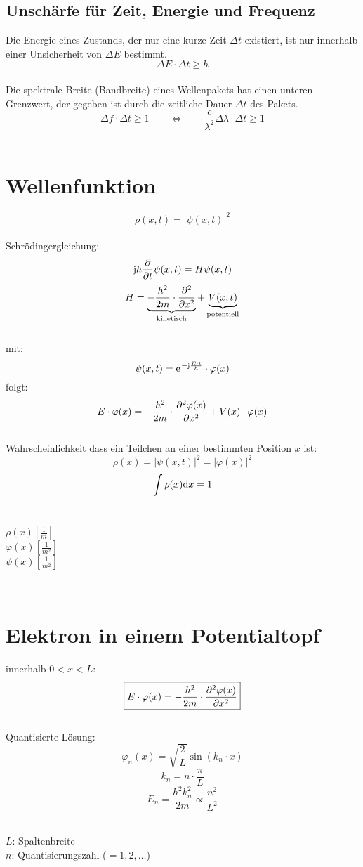 \subsection{Unschärfe für Zeit, Energie und Frequenz}
Die Energie eines Zustands, der nur eine kurze Zeit $\Delta t$ existiert, ist nur innerhalb einer Unsicherheit von $\Delta E$ bestimmt.\\
\[
	\Delta E \cdot \Delta t \geq h
\]
\\
Die spektrale Breite (Bandbreite) eines Wellenpakets hat einen unteren Grenzwert, der gegeben ist durch die zeitliche Dauer $\Delta t$ des Pakets.
\[
	\Delta f \cdot \Delta t \geq 1 
	\qquad \Leftrightarrow \qquad
	\frac{c}{\lambda^2}\Delta \lambda \cdot \Delta t \geq 1
\]
\\

\section{Wellenfunktion}
\[\boxed{
	\rho(x,t) = \left| \psi(x,t) \right|^2 
}\]
\\
Schrödingergleichung:
\[
	\mathrm{j} h \frac{\partial }{\partial t} \psi(x,t) = H \psi(x,t)
\]
\[
	H = \underbrace{- \frac{h^2}{2m} \cdot \frac{\partial ^2}{\partial x^2}}_{\text{kinetisch}} + \underbrace{V(x,t)}_{\text{potentiell}}
\]
\\
mit:
\[
	\psi(x,t) = \mathrm{e\;\!}^{-\mathrm{j} \frac{E \cdot t}{h}} \cdot \varphi(x)
\]
folgt:
\[
	E \cdot \varphi(x) = - \frac{h^2}{2m} \cdot \frac{\partial ^2 \varphi(x)}{\partial x^2} + V(x) \cdot \varphi(x)
\]
\\
Wahrscheinlichkeit dass ein Teilchen an einer bestimmten Position $x$ ist:
\[\boxed{
	\rho(x) = \left| \psi(x,t) \right|^2 = \left| \varphi(x) \right|^2
}\]
\[
	\int \rho(x) \mathrm{d} x = 1
\]
\\
\begin{footnotesize}
	$\rho(x) \left[ \frac{1}{m} \right]$\\
	$\varphi(x) \left[ \frac{1}{m^2} \right]$\\
	$\psi(x) \left[ \frac{1}{m^2} \right]$
\end{footnotesize}
\\

\section{Elektron in einem Potentialtopf}
innerhalb $0 < x < L$:
\[\boxed{
	E \cdot \varphi(x) = - \frac{h^2}{2m} \cdot \frac{\partial ^2 \varphi(x)}{\partial x^2}
}\]
\\
Quantisierte Lösung:
\[
	\varphi_n(x) = \sqrt{\frac{2}{L}} \sin(k_n \cdot x)
\]
\[
	k_n = n \cdot \frac{\pi}{L}
\]
\[
	E_n = \frac{h^2 k_n^2}{2m} \propto \frac{n^2}{L^2}
\]
\\
\begin{footnotesize}
	$L$: Spaltenbreite\\
	$n$: Quantisierungszahl ($ = 1,2,\dots$)
\end{footnotesize}
\\

